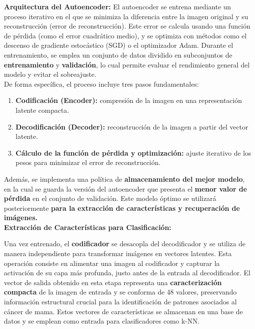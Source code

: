 \documentclass[12pt]{article} %
\begin{document}
\textbf{Arquitectura del Autoencoder:}
El autoencoder se entrena mediante un proceso iterativo en el que se minimiza la diferencia entre la imagen original y su reconstrucción (error de reconstrucción). Este error se calcula usando una función de pérdida (como el error cuadrático medio), y se optimiza con métodos como el descenso de gradiente estocástico (SGD) o el optimizador Adam. Durante el entrenamiento, se emplea un conjunto de datos dividido en subconjuntos de \textbf{entrenamiento} y \textbf{validación}, lo cual permite evaluar el rendimiento general del modelo y evitar el sobreajuste.\\

De forma específica, el proceso incluye tres pasos fundamentales:\\

\begin{enumerate}
    \item \textbf{Codificación (Encoder):} compresión de la imagen en una representación latente compacta.
    \item \textbf{Decodificación (Decoder):} reconstrucción de la imagen a partir del vector latente.
    \item \textbf{Cálculo de la función de pérdida y optimización:} ajuste iterativo de los pesos para minimizar el error de reconstrucción.
\end{enumerate}

Además, se implementa una política de \textbf{almacenamiento del mejor modelo}, en la cual se guarda la versión del autoencoder que presenta el \textbf{menor valor de pérdida} en el conjunto de validación. Este modelo óptimo se utilizará posteriormente \textbf{para la extracción de características y recuperación de imágenes.}\\


\textbf{Extracción de Características para Clasificación:}

Una vez entrenado, el \textbf{codificador} se desacopla del decodificador y se utiliza de manera independiente para transformar imágenes en vectores latentes. Esta operación consiste en alimentar una imagen al codificador y capturar la activación de su capa más profunda, justo antes de la entrada al decodificador. El vector de salida obtenido en esta etapa representa una \textbf{caracterización compacta} de la imagen de entrada y se conforma de 48 valores, preservando información estructural crucial para la identificación de patrones asociados al cáncer de mama. Estos vectores de características se almacenan en una base de datos y se emplean como entrada para clasificadores como k-NN.
\end{document}
